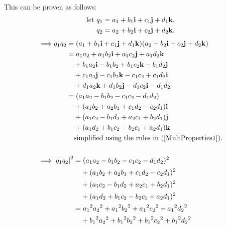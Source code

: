 \documentclass[12pt]{article}
\theoremstyle{definition}
\begin{document}
This can be proven as follows:
\begin{equation}
    \begin{aligned}
        \text{let } & q_1 = a_1 + b_1\vb{i} + c_1\vb{j} + d_1\vb{k}, \\
        & q_2 = a_2 + b_2\vb{i} + c_2\vb{j} + d_2\vb{k}. \\
    \end{aligned}
\end{equation}
\begin{alignat}{2}
    \implies & q_1q_2 = (a_1 + b_1\vb{i} + c_1\vb{j} + d_1\vb{k})(a_2 + b_2\vb{i} + c_2\vb{j} + d_2\vb{k}) \\
             & \phantom{q_1q_2} = a_1a_2 + a_1b_2\vb{i} + a_1c_2\vb{j} + a_1d_2\vb{k} \\
             & \phantom{q_1q_2=} + b_1a_2\vb{i} - b_1b_2 + b_1c_2\vb{k} - b_1d_2\vb{j} \nonumber \\
             & \phantom{q_1q_2=} + c_1a_2\vb{j} - c_1b_2\vb{k} - c_1c_2 + c_1d_2\vb{i} \nonumber \\
             & \phantom{q_1q_2=} + d_1a_2\vb{k} + d_1b_2\vb{j} - d_1c_2\vb{i} - d_1d_2 \nonumber \\
             & \phantom{q_1q_2} = (a_1a_2 - b_1b_2 - c_1c_2 - d_1d_2) \\
             & \phantom{q_1q_2=} + (a_1b_2 + a_2b_1 + c_1d_2 - c_2d_1)\vb{i} \nonumber \\
             & \phantom{q_1q_2=} + (a_1c_2 - b_1d_2 + a_2c_1 + b_2d_1)\vb{j} \nonumber \\
             & \phantom{q_1q_2=} + (a_1d_2 + b_1c_2 - b_2c_1 + a_2d_1)\vb{k} \nonumber \\
             & \phantom{q_1q_2=} \text{simplified using the rules in (\ref{MultProperties1})}. \nonumber \\[15pt]
    \implies & \abs{q_1q_2}^2 = (a_1a_2 - b_1b_2 - c_1c_2 - d_1d_2)^2 \\
             & \phantom{\abs{q_1q_2}^2=} + (a_1b_2 + a_2b_1 + c_1d_2 - c_2d_1)^2 \nonumber \\
             & \phantom{\abs{q_1q_2}^2=} + (a_1c_2 - b_1d_2 + a_2c_1 + b_2d_1)^2 \nonumber \\
             & \phantom{\abs{q_1q_2}^2=} + (a_1d_2 + b_1c_2 - b_2c_1 + a_2d_1)^2 \nonumber \\
             & \phantom{\abs{q_1q_2}^2} = {a_1}^2{a_2}^2 + {a_1}^2{b_2}^2 + {a_1}^2{c_2}^2 + {a_1}^2{d_2}^2 \label{eqnq1q2-1} \\
             & \phantom{\abs{q_1q_2}^2=} + {b_1}^2{a_2}^2 + {b_1}^2{b_2}^2 + {b_1}^2{c_2}^2 + {b_1}^2{d_2}^2 \nonumber \\

\end{alignat}
\end{document}

